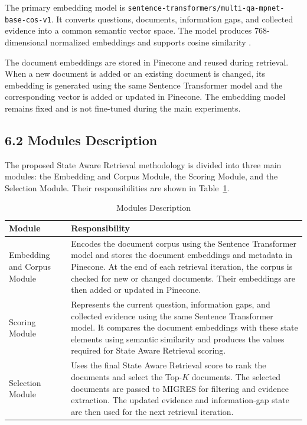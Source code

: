 \documentclass[12pt,a4paper]{report}
\begin{document}
The primary embedding model is
\texttt{sentence-transformers/multi-qa-mpnet-base-cos-v1}. It converts
questions, documents, information gaps, and collected evidence into a
common semantic vector space. The model produces 768-dimensional
normalized embeddings and supports cosine similarity
\cite{reimers2019sentence,st2020mpnet}.

The document embeddings are stored in Pinecone and reused during
retrieval. When a new document is added or an existing document is
changed, its embedding is generated using the same Sentence Transformer
model and the corresponding vector is added or updated in Pinecone.
The embedding model remains fixed and is not fine-tuned during the main
experiments.

\subsection*{6.2 Modules Description}

The proposed State Aware Retrieval methodology is divided into three
main modules: the Embedding and Corpus Module, the Scoring Module, and
the Selection Module. Their responsibilities are shown in
Table~\ref{tab:module-description}.

\begin{table}[H]
\centering
\caption{Modules Description}
\label{tab:module-description}
\renewcommand{\arraystretch}{1.25}
\begin{tabular}{|p{1.75in}|p{4.3in}|}
\hline
\textbf{Module} & \textbf{Responsibility} \\ \hline

Embedding and Corpus Module &
Encodes the document corpus using the Sentence Transformer model and
stores the document embeddings and metadata in Pinecone. At the end of
each retrieval iteration, the corpus is checked for new or changed
documents. Their embeddings are then added or updated in Pinecone.
\\ \hline

Scoring Module &
Represents the current question, information gaps, and collected
evidence using the same Sentence Transformer model. It compares the
document embeddings with these state elements using semantic
similarity and produces the values required for State Aware Retrieval
scoring. \\ \hline

Selection Module &
Uses the final State Aware Retrieval score to rank the documents and
select the Top-$K$ documents. The selected documents are passed to
MIGRES for filtering and evidence extraction. The updated evidence and
information-gap state are then used for the next retrieval iteration.
\\ \hline

\end{tabular}
\end{table}
\end{document}
